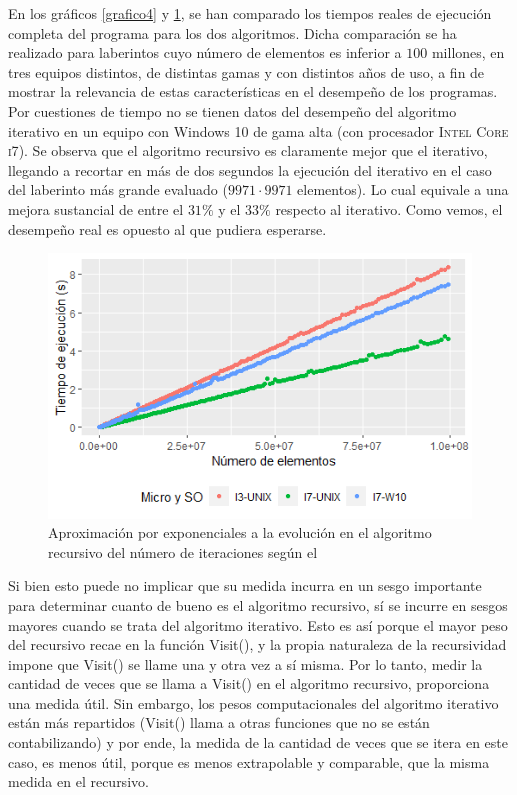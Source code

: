 \documentclass[12pt,a4paper]{article}
\begin{document}
En los gráficos \ref{grafico4} y \ref{grafico5}, se han comparado los tiempos reales de ejecución completa del programa para los dos algoritmos. Dicha comparación se ha realizado para laberintos cuyo número de elementos es inferior a $100$ millones, en tres equipos distintos, de distintas gamas y con distintos años de uso, a fin de mostrar la relevancia de estas características en el desempeño de los programas. Por cuestiones de tiempo no se tienen datos del desempeño del algoritmo iterativo en un equipo con Windows 10 de gama alta (con procesador \textsc{Intel Core i7}). Se observa que el algoritmo recursivo es claramente mejor que el iterativo, llegando a recortar en más de dos segundos la ejecución del iterativo en el caso del laberinto más grande evaluado ($9971\cdot9971$ elementos). Lo cual equivale a una mejora sustancial de entre el $31\%$ y el $33\%$ respecto al iterativo. Como vemos, el desempeño real es opuesto al que pudiera esperarse. 

\vspace{0.2cm}

\begin{figure}[H]
	\centering
	\includegraphics[scale=0.9]{fotos/Tiempos_Iterativo1.png}
	\caption{Aproximación por exponenciales a la evolución en el algoritmo recursivo del número de iteraciones según el }
	\label{grafico5}
\end{figure}
\vspace{0.2cm}

 Si bien esto puede no implicar que su medida incurra en un sesgo importante para determinar cuanto de bueno es el algoritmo recursivo, sí se incurre en sesgos mayores cuando se trata del algoritmo iterativo. Esto es así porque el mayor peso del recursivo recae en la función \textsf{Visit()}, y la propia naturaleza de la recursividad impone que \textsf{Visit()} se llame una y otra vez a sí misma. Por lo tanto, medir la cantidad de veces que se llama a \textsf{Visit()} en el algoritmo recursivo, proporciona una medida útil. Sin embargo, los pesos computacionales del algoritmo iterativo están más repartidos (\textsf{Visit()} llama a otras funciones que no se están contabilizando) y por ende, la medida de la cantidad de veces que se itera en este caso, es menos útil, porque es menos extrapolable y comparable, que la misma medida en el recursivo. 
\end{document}
